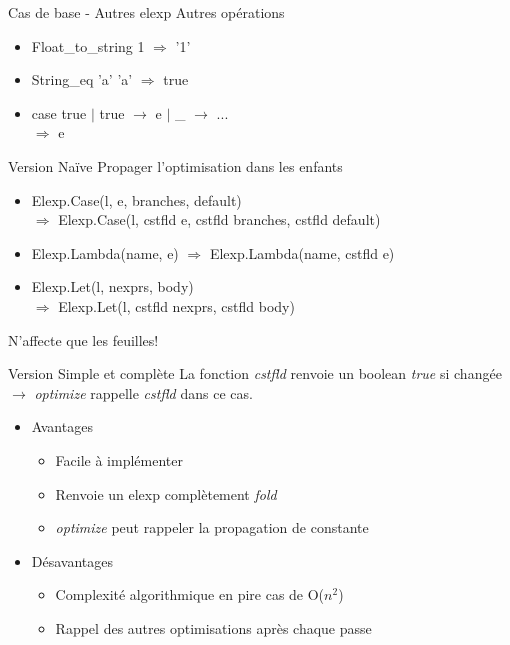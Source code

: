 \documentclass{beamer}
\begin{document}
\begin{frame}{Cas de base - Autres elexp}
Autres opérations
  \begin{itemize}
    \item Float\_to\_string 1 $\Rightarrow$ '1'
    \item String\_eq 'a' 'a' $\Rightarrow$ true 
    \item case true $\mid$ true $\rightarrow$ e $\mid$ \_ $\rightarrow$ ... \\ $\Rightarrow$ e
  \end{itemize}
\end{frame}
\begin{frame}{Version Naïve}
  Propager l'optimisation dans les enfants
  \begin{itemize}
  \item Elexp.Case(l, e, branches, default)
    \\ $\Rightarrow$ Elexp.Case(l, cstfld e, cstfld branches, cstfld default)
  \item Elexp.Lambda(name, e) $\Rightarrow$ Elexp.Lambda(name, cstfld e)
  \item Elexp.Let(l, nexprs, body) \\ $\Rightarrow$ Elexp.Let(l, cstfld nexprs, cstfld body)
  \end{itemize}
\pause
N'affecte que les feuilles!
\end{frame}
\begin{frame}{Version Simple et complète}
  La fonction \emph{cstfld} renvoie un boolean \emph{true} si changée \\
  $\rightarrow$ \emph{optimize} rappelle \emph{cstfld} dans ce cas.
  \pause
  \begin{itemize}

    \item Avantages
      \begin{itemize}
        \item Facile à implémenter
        \item Renvoie un elexp complètement \emph{fold}
        \item \emph{optimize} peut rappeler la propagation de constante
      \end{itemize}
  \pause
    \item Désavantages
      \begin{itemize}
        \item Complexité algorithmique en pire cas de O($n^2$)
        \item Rappel des autres optimisations après chaque passe
      \end{itemize}

  \end{itemize}
\end{frame}
\end{document}

